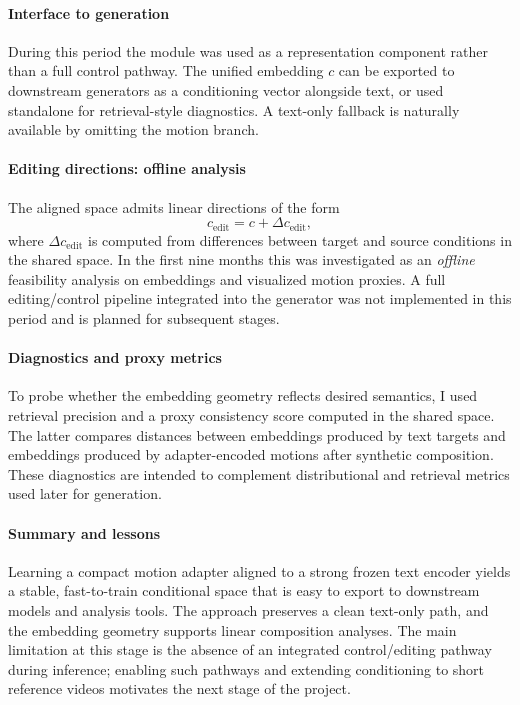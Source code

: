 \documentclass[a4paper,12pt]{article}
\begin{document}
\paragraph{Interface to generation}
During this period the module was used as a representation component rather than a full control pathway. The unified embedding \(c\) can be exported to downstream generators as a conditioning vector alongside text, or used standalone for retrieval-style diagnostics. A text-only fallback is naturally available by omitting the motion branch.

\paragraph{Editing directions: offline analysis}
The aligned space admits linear directions of the form
\begin{equation}
c_{\mathrm{edit}} = c + \Delta c_{\mathrm{edit}},
\end{equation}
where \(\Delta c_{\mathrm{edit}}\) is computed from differences between target and source conditions in the shared space. In the first nine months this was investigated as an \emph{offline} feasibility analysis on embeddings and visualized motion proxies. A full editing/control pipeline integrated into the generator was not implemented in this period and is planned for subsequent stages. %

\paragraph{Diagnostics and proxy metrics}
To probe whether the embedding geometry reflects desired semantics, I used retrieval precision and a proxy consistency score computed in the shared space. The latter compares distances between embeddings produced by text targets and embeddings produced by adapter-encoded motions after synthetic composition. These diagnostics are intended to complement distributional and retrieval metrics used later for generation. %

\paragraph{Summary and lessons}
Learning a compact motion adapter aligned to a strong frozen text encoder yields a stable, fast-to-train conditional space that is easy to export to downstream models and analysis tools. The approach preserves a clean text-only path, and the embedding geometry supports linear composition analyses. The main limitation at this stage is the absence of an integrated control/editing pathway during inference; enabling such pathways and extending conditioning to short reference videos motivates the next stage of the project. %
\end{document}
